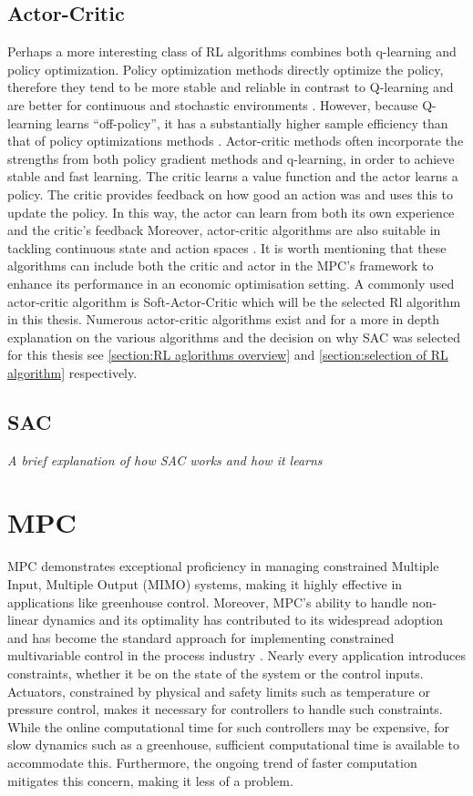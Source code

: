 \subsection{Actor-Critic}
Perhaps a more interesting class of RL algorithms combines both q-learning and policy optimization. Policy optimization methods directly optimize the policy, therefore they tend to be more stable and reliable in contrast to Q-learning and are better for continuous and stochastic environments \cite{suttonReinforcementLearningIntroduction2014}. However, because Q-learning learns ``off-policy'', it has a substantially higher sample efficiency than that of policy optimizations methods \cite{suttonReinforcementLearningIntroduction2014}.
Actor-critic methods often incorporate the strengths from both policy gradient methods and q-learning, in order to achieve stable and fast learning. The critic learns a value function and the actor learns a policy. The critic provides feedback on how good an action was and uses this to update the policy. In this way, the actor can learn from both its own experience and the critic's feedback 
Moreover, actor-critic algorithms are also suitable in tackling continuous state and action spaces \cite{suttonReinforcementLearningIntroduction2014}. It is worth mentioning that these algorithms can include both the critic and actor in the MPC's framework to enhance its performance in an economic optimisation setting. A commonly used actor-critic algorithm  is Soft-Actor-Critic which will be the selected Rl algorithm in this thesis. Numerous actor-critic algorithms exist and for a more in depth explanation on the various algorithms and the decision on why SAC was selected  for this thesis see \autoref{section:RL aglorithms overview} and \autoref{section:selection of RL algorithm} respectively.

\subsection{SAC}
\emph{A brief explanation of how SAC works and how it learns}


\section{MPC}
MPC demonstrates exceptional proficiency in managing constrained Multiple Input, Multiple Output (MIMO) systems, making it highly effective in applications like greenhouse control. Moreover, MPC's ability to handle non-linear dynamics and its optimality has contributed to its widespread adoption and has become the standard approach for implementing constrained multivariable control in the process industry \cite{daiDiscreteTimeModelPredictive2012}. Nearly every application introduces constraints, whether it be on the state of the system or the control inputs. Actuators, constrained by physical and safety limits such as temperature or pressure control, makes it necessary for controllers to handle such constraints. While the online computational time for such controllers may be expensive, for slow dynamics such as a greenhouse, sufficient computational time is available to accommodate this. Furthermore, the ongoing trend of faster computation mitigates this concern, making it less of a problem.

